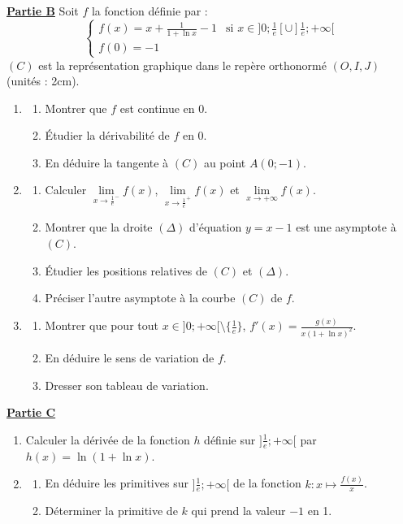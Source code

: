 \documentclass[12pt,a4paper]{article}
\begin{document}
\underline{\textbf{Partie B}}
Soit $f$ la fonction définie par :
\[
\begin{cases} 
f(x) = x + \frac{1}{1 + \ln x} - 1 & \text{si } x \in ]0; \frac{1}{e}[ \cup ]\frac{1}{e}; +\infty[ \\
f(0) = -1
\end{cases}
\]
$(C)$ est la représentation graphique dans le repère orthonormé $(O, I, J)$ (unités : 2cm).
\begin{enumerate}
    \item 
    \begin{enumerate}
        \item Montrer que $f$ est continue en 0.
        \item Étudier la dérivabilité de $f$ en 0.
        \item En déduire la tangente à $(C)$ au point $A(0; -1)$.
    \end{enumerate}
    \item 
    \begin{enumerate}
        \item Calculer $\lim\limits_{x \to \frac{1}{e}^-} f(x)$, $\lim\limits_{x \to \frac{1}{e}^+} f(x)$ et $\lim\limits_{x \to +\infty} f(x)$.
        \item Montrer que la droite $(\Delta)$ d'équation $y = x - 1$ est une asymptote à $(C)$.
        \item Étudier les positions relatives de $(C)$ et $(\Delta)$.
        \item Préciser l'autre asymptote à la courbe $(C)$ de $f$.
    \end{enumerate}
    \item 
    \begin{enumerate}
        \item Montrer que pour tout $x \in ]0; +\infty[ \setminus \{\frac{1}{e}\}$, $f'(x) = \frac{g(x)}{x(1 + \ln x)^2}$.
        \item En déduire le sens de variation de $f$.
        \item Dresser son tableau de variation.
    \end{enumerate}
\end{enumerate}

\underline{\textbf{Partie C}}
\begin{enumerate}
    \item Calculer la dérivée de la fonction $h$ définie sur $]\frac{1}{e}; +\infty[$ par $h(x) = \ln(1 + \ln x)$.
    \item 
    \begin{enumerate}
        \item En déduire les primitives sur $]\frac{1}{e}; +\infty[$ de la fonction $k : x \mapsto \frac{f(x)}{x}$.
        \item Déterminer la primitive de $k$ qui prend la valeur $-1$ en 1.
    \end{enumerate}
\end{enumerate}
\end{document}
